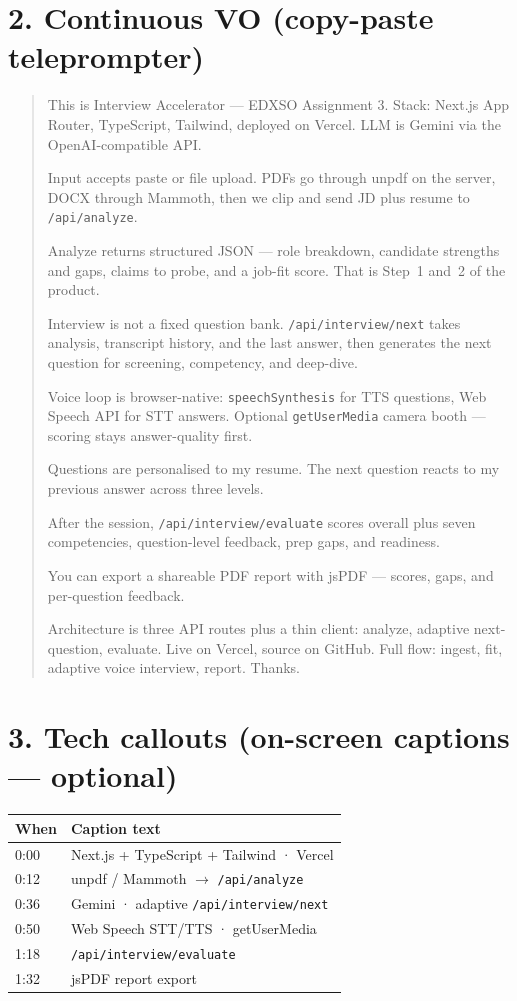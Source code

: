 \documentclass[11pt,a4paper]{article}
\begin{document}
\section*{2. Continuous VO (copy-paste teleprompter)}

\begin{quote}
\small
This is Interview Accelerator --- EDXSO Assignment 3. Stack: Next.js App Router, TypeScript, Tailwind, deployed on Vercel. LLM is Gemini via the OpenAI-compatible API.

Input accepts paste or file upload. PDFs go through unpdf on the server, DOCX through Mammoth, then we clip and send JD plus resume to \texttt{/api/analyze}.

Analyze returns structured JSON --- role breakdown, candidate strengths and gaps, claims to probe, and a job-fit score. That is Step~1 and~2 of the product.

Interview is not a fixed question bank. \texttt{/api/interview/next} takes analysis, transcript history, and the last answer, then generates the next question for screening, competency, and deep-dive.

Voice loop is browser-native: \texttt{speechSynthesis} for TTS questions, Web Speech API for STT answers. Optional \texttt{getUserMedia} camera booth --- scoring stays answer-quality first.

Questions are personalised to my resume. The next question reacts to my previous answer across three levels.

After the session, \texttt{/api/interview/evaluate} scores overall plus seven competencies, question-level feedback, prep gaps, and readiness.

You can export a shareable PDF report with jsPDF --- scores, gaps, and per-question feedback.

Architecture is three API routes plus a thin client: analyze, adaptive next-question, evaluate. Live on Vercel, source on GitHub. Full flow: ingest, fit, adaptive voice interview, report. Thanks.
\end{quote}

\section*{3. Tech callouts (on-screen captions --- optional)}
\begin{center}
\begin{tabular}{@{}ll@{}}
\toprule
\textbf{When} & \textbf{Caption text} \\
\midrule
0:00 & Next.js + TypeScript + Tailwind · Vercel \\
0:12 & unpdf / Mammoth $\rightarrow$ \texttt{/api/analyze} \\
0:36 & Gemini · adaptive \texttt{/api/interview/next} \\
0:50 & Web Speech STT/TTS · getUserMedia \\
1:18 & \texttt{/api/interview/evaluate} \\
1:32 & jsPDF report export \\
\bottomrule
\end{tabular}
\end{center}
\end{document}
